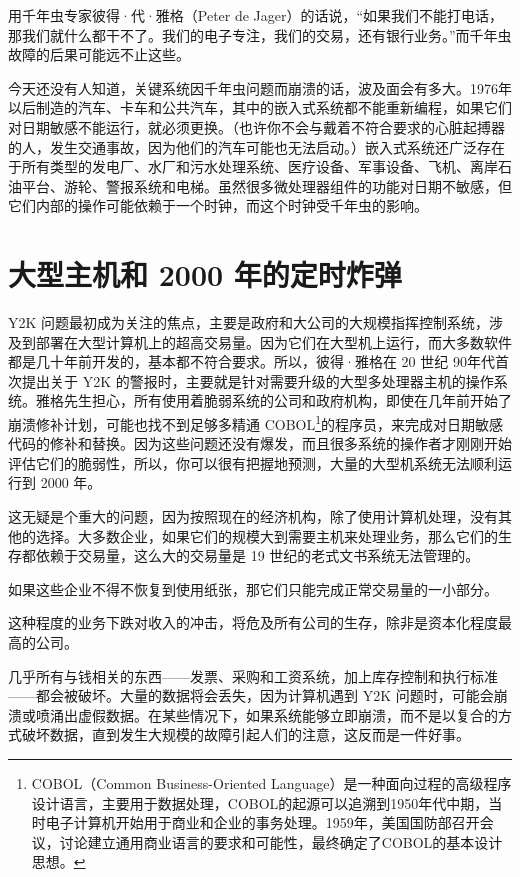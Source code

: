 用千年虫专家彼得·代·雅格（Peter de Jager）的话说，“如果我们不能打电话，那我们就什么都干不了。我们的电子专注，我们的交易，还有银行业务。”而千年虫故障的后果可能远不止这些。


今天还没有人知道，关键系统因千年虫问题而崩溃的话，波及面会有多大。1976年以后制造的汽车、卡车和公共汽车，其中的嵌入式系统都不能重新编程，如果它们对日期敏感不能运行，就必须更换。（也许你不会与戴着不符合要求的心脏起搏器的人，发生交通事故，因为他们的汽车可能也无法启动。）嵌入式系统还广泛存在于所有类型的发电厂、水厂和污水处理系统、医疗设备、军事设备、飞机、离岸石油平台、游轮、警报系统和电梯。虽然很多微处理器组件的功能对日期不敏感，但它们内部的操作可能依赖于一个时钟，而这个时钟受千年虫的影响。


\section{大型主机和 2000 年的定时炸弹}
Y2K 问题最初成为关注的焦点，主要是政府和大公司的大规模指挥控制系统，涉及到部署在大型计算机上的超高交易量。因为它们在大型机上运行，而大多数软件都是几十年前开发的，基本都不符合要求。所以，彼得·雅格在 20 世纪 90年代首次提出关于 Y2K 的警报时，主要就是针对需要升级的大型多处理器主机的操作系统。雅格先生担心，所有使用着脆弱系统的公司和政府机构，即使在几年前开始了崩溃修补计划，可能也找不到足够多精通 COBOL\footnote{COBOL（Common Business-Oriented Language）是一种面向过程的高级程序设计语言，主要用于数据处理，COBOL的起源可以追溯到1950年代中期，当时电子计算机开始用于商业和企业的事务处理。1959年，美国国防部召开会议，讨论建立通用商业语言的要求和可能性，最终确定了COBOL的基本设计思想。}的程序员，来完成对日期敏感代码的修补和替换。因为这些问题还没有爆发，而且很多系统的操作者才刚刚开始评估它们的脆弱性，所以，你可以很有把握地预测，大量的大型机系统无法顺利运行到 2000 年。


这无疑是个重大的问题，因为按照现在的经济机构，除了使用计算机处理，没有其他的选择。大多数企业，如果它们的规模大到需要主机来处理业务，那么它们的生存都依赖于交易量，这么大的交易量是 19 世纪的老式文书系统无法管理的。


如果这些企业不得不恢复到使用纸张，那它们只能完成正常交易量的一小部分。


这种程度的业务下跌对收入的冲击，将危及所有公司的生存，除非是资本化程度最高的公司。


几乎所有与钱相关的东西——发票、采购和工资系统，加上库存控制和执行标准——都会被破坏。大量的数据将会丢失，因为计算机遇到 Y2K 问题时，可能会崩溃或喷涌出虚假数据。在某些情况下，如果系统能够立即崩溃，而不是以复合的方式破坏数据，直到发生大规模的故障引起人们的注意，这反而是一件好事。


